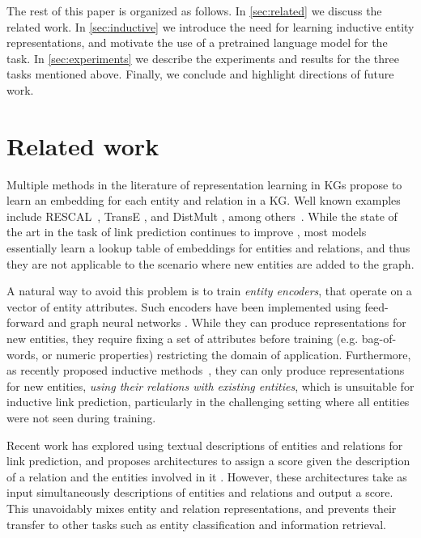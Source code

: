 \documentclass[sigconf]{acmart}
\begin{document}
The rest of this paper is organized as follows. In \autoref{sec:related} we discuss the related work. In \autoref{sec:inductive} we introduce the need for learning inductive entity representations, and motivate the use of a pretrained language model for the task. In \autoref{sec:experiments} we describe the experiments and results for the three tasks mentioned above. Finally, we conclude and highlight directions of future work.  

\section{Related work}
\label{sec:related}
Multiple methods in the literature of representation learning in KGs propose to learn an embedding for each entity and relation in a KG. Well known examples include RESCAL~\citep{nickel2011three}, TransE \citep{bordes2013translating}, and DistMult \citep{yang2015embedding}, among others~\citep{nickel2015review,wang2017knowledge}. While the state of the art in the task of link prediction continues to improve \citep{ruffinelli2020you}, most models essentially learn a lookup table of embeddings for entities and relations, and thus they are not applicable to the scenario where new entities are added to the graph.

A natural way to avoid this problem is to train \textit{entity encoders}, that operate on a vector of entity attributes. Such encoders have been implemented using feed-forward and graph neural networks \citep{cao2016deep,hamilton2017inductive,kipf2016variational,schlichtkrull2018modeling}. While they can produce representations for new entities, they require fixing a set of attributes before training (e.g. bag-of-words, or numeric properties) restricting the domain of application. Furthermore, as recently proposed inductive methods~\cite{teru2019inductive}, they can only produce representations for new entities, \emph{using their relations with existing entities}, which is unsuitable for inductive link prediction, particularly in the challenging setting where all entities were not seen during training.

Recent work has explored using textual descriptions of entities and relations for link prediction, and proposes architectures to assign a score given the description of a relation and the entities involved in it \citep{shi2018open,yao2019kg}. However, these architectures take as input simultaneously descriptions of entities and relations and output a score. This unavoidably mixes entity and relation representations, and prevents their transfer to other tasks such as entity classification and information retrieval.
\end{document}
